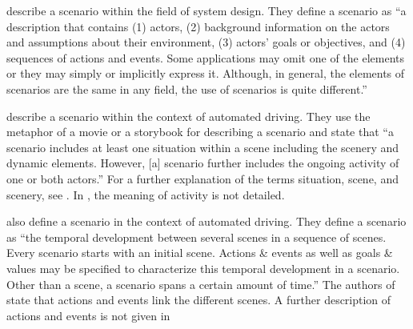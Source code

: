 \textcite{go2004blind} describe a scenario within the field of system design. They define a scenario as ``a description that contains (1) actors, (2) background information on the actors and assumptions about their environment, (3) actors' goals or objectives, and (4) sequences of actions and events. Some applications may omit one of the elements or they may simply or implicitly express it. Although, in general, the elements of scenarios are the same in any field, the use of scenarios is quite different.'' 

\textcite{geyer2014} describe a scenario within the context of automated driving. They use the metaphor of a movie or a storybook for describing a scenario and state that ``a scenario includes at least one situation within a scene including the scenery and dynamic elements. However, [a] scenario further includes the ongoing activity of one or both actors.'' For a further explanation of the terms situation, scene, and scenery, see \autocite{geyer2014}. 
In \autocite{geyer2014}, the meaning of activity is not detailed.

\textcite{ulbrich2015} also define a scenario in the context of automated driving. They define a scenario as ``the temporal development between several scenes in a sequence of scenes. Every scenario starts with an initial scene. Actions \& events as well as goals \& values may be specified to characterize this temporal development in a scenario. Other than a scene, a scenario spans a certain amount of time.'' The authors of \autocite{ulbrich2015} state that actions and events link the different scenes. A further description of actions and events is not given in \autocite{ulbrich2015}


